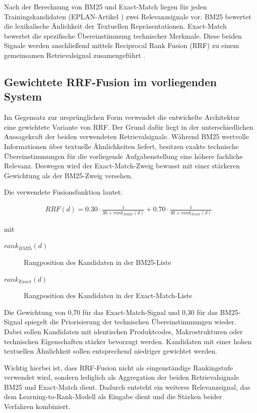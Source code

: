 Nach der Berechnung von BM25 und Exact-Match liegen für jeden Trainingskandidaten (EPLAN-Artikel \cite{EPLANArtikelverwaltung}) zwei Relevanzsignale vor. 
BM25 bewertet die lexikalische Änlichkeit der Textuellen Repräsentationen. Exact-Match bewertet die spezifische Übereinstimmung technischer Merkmale.
Diese beiden Signale werden anschließend mittels Reciprocal Rank Fusion (RRF) zu einem gemeinsamen Retrievalsignal zusamengeführt \cite{cormack2009rrf}.




\subsection{Gewichtete RRF-Fusion im vorliegenden System} 

Im Gegensatz zur ursprünglichen Form verwendet die entwickelte Architektur eine gewichtete Variante von RRF. 
Der Grund dafür liegt in der unterschiedlichen Aussagekraft der beiden verwendeten Retrievalsignale. 
Während BM25 wertvolle Informationen über textuelle Ähnlichkeiten liefert, besitzen exakte technische Übereinstimmungen für die vorliegende Aufgabenstellung eine höhere fachliche Relevanz. 
Deswegen wird der Exact-Match-Zweig bewusst mit einer stärkeren Gewichtung als der BM25-Zweig versehen.

Die verwendete Fusionsfunktion lautet: 

\begin{align} 
    RRF(d) = 0.30 \cdot \frac{1} {30 + rank_{BM25}(d)} + 0.70 \cdot \frac{1} {30 + rank_{Exact}(d)} 
\end{align} 

mit 

\begin{description} 
    \item[$rank_{BM25}(d)$] Rangposition des Kandidaten in der BM25-Liste 
    \item[$rank_{Exact}(d)$] Rangposition des Kandidaten in der Exact-Match-Liste 
\end{description} 

Die Gewichtung von 0,70 für das Exact-Match-Signal und 0,30 für das BM25-Signal spiegelt die Priorisierung der technischen Übereinstimmungen wieder.
Dabei sollen Kandidaten mit identischen Produktcodes, Makrostrukturen oder technischen Eigenschaften stärker bevorzugt werden.
Kandidaten mit einer hohen textuellen Ähnlichkeit sollen entsprechend niedriger gewichtet werden.

Wichtig hierbei ist, dass RRF-Fusion nicht als eingenständige Rankingstufe verwendet wird, sondern lediglich als Aggregation der beiden Retrievalsignale BM25 und Exact-Match dient.
Dadurch entsteht ein weiteres Relevanzsignal, das dem Learning-to-Rank-Modell als Eingabe dient und die Stärken beider Verfahren kombiniert.